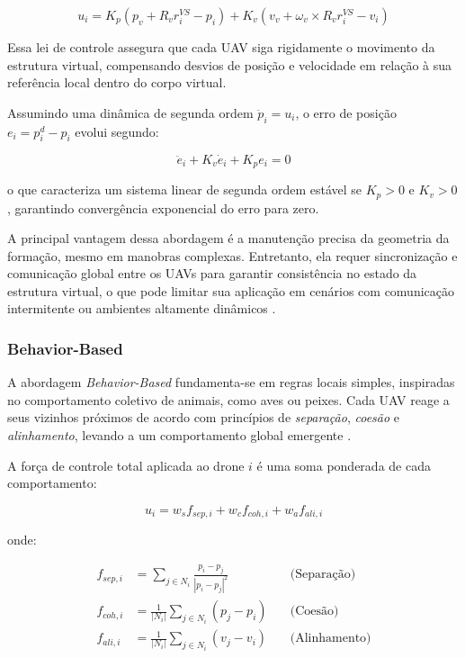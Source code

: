 \documentclass[portuguese]{sbcreviews-2025}%
\begin{document}
\[
u_i = K_p (p_v + R_v r_i^{VS} - p_i) + K_v (v_v + \omega_v \times R_v r_i^{VS} - v_i)
\]

Essa lei de controle assegura que cada UAV siga rigidamente o movimento da estrutura virtual, compensando desvios de posição e velocidade em relação à sua referência local dentro do corpo virtual.

Assumindo uma dinâmica de segunda ordem $\ddot{p}_i = u_i$, o erro de posição $e_i = p_i^{d} - p_i$ evolui segundo:

\[
\ddot{e}_i + K_v \dot{e}_i + K_p e_i = 0
\]

o que caracteriza um sistema linear de segunda ordem estável se $K_p > 0$ e $K_v > 0$, garantindo convergência exponencial do erro para zero.

A principal vantagem dessa abordagem é a manutenção precisa da geometria da formação, mesmo em manobras complexas. Entretanto, ela requer sincronização e comunicação global entre os UAVs para garantir consistência no estado da estrutura virtual, o que pode limitar sua aplicação em cenários com comunicação intermitente ou ambientes altamente dinâmicos \cite{bu2024advancement, ouyang2023formation}.




\subsubsection{Behavior-Based}

A abordagem \textit{Behavior-Based} fundamenta-se em regras locais simples, inspiradas no comportamento coletivo de animais, como aves ou peixes. Cada UAV reage a seus vizinhos próximos de acordo com princípios de \textit{separação}, \textit{coesão} e \textit{alinhamento}, levando a um comportamento global emergente \cite{ouyang2023formation}.

A força de controle total aplicada ao drone $i$ é uma soma ponderada de cada comportamento:

\[
u_i = w_s f_{sep,i} + w_c f_{coh,i} + w_a f_{ali,i}
\]

onde:

\[
\begin{aligned}
f_{sep,i} &= \sum_{j \in N_i} \frac{p_i - p_j}{|p_i - p_j|^2} \quad &\text{(Separação)} \\[6pt]
f_{coh,i} &= \frac{1}{|N_i|}\sum_{j \in N_i}(p_j - p_i) \quad &\text{(Coesão)} \\[6pt]
f_{ali,i} &= \frac{1}{|N_i|}\sum_{j \in N_i}(v_j - v_i) \quad &\text{(Alinhamento)}
\end{aligned}
\]
\end{document}
